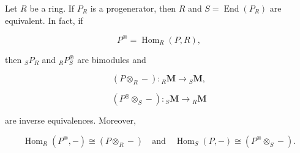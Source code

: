 Let $R$ be a ring. If $P_R$ is a progenerator, then $R$ and $S = \operatorname{End}(P_R)$ are equivalent. In fact, if

$$P^{\circledast} = \operatorname{Hom}_R(P, R),$$

then ${}_S P_R$ and ${}_R P^{\circledast}_S$ are bimodules and

$$(P \otimes_R -) : {}_R\mathbf{M} \to {}_S\mathbf{M},$$

$$(P^{\circledast} \otimes_S -) : {}_S\mathbf{M} \to {}_R\mathbf{M}$$

are inverse equivalences. Moreover,

$$\operatorname{Hom}_R(P^{\circledast}, -) \cong (P \otimes_R -) \quad \text{and} \quad \operatorname{Hom}_S(P, -) \cong (P^{\circledast} \otimes_S -).$$
